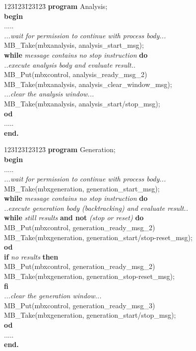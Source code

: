 \begin{tabbing}
123\= 123\= 123\= 123\= \kill
{\bf program} Analysis; \\
{\bf begin} \\
\> ..... \\
\> {\em ...wait for permission to continue with process body...} \\
\> MB\_Take(mbxanalysis, analysis\_start\_msg); \\
\> {\bf while} {\em message contains no stop instruction} {\bf do} \\
\> \> {\em ..execute analysis body and evaluate result..} \\
\> \> MB\_Put(mbxcontrol, analysis\_ready\_msg\_2) \\
\> \> MB\_Take(mbxanalysis, analysis\_clear\_window\_msg); \\
\> \> {\em ...clear the analysis window...} \\
\> \> MB\_Take(mbxanalysis, analysis\_start/stop\_msg); \\
\> {\bf od} \\
\> ..... \\
{\bf end.} \\
\end{tabbing}
\begin{tabbing}
123\= 123\= 123\= 123\= \kill
{\bf program} Generation; \\
{\bf begin} \\
\> ..... \\
\> {\em ...wait for permission to continue with process body...} \\
\> MB\_Take(mbxgeneration, generation\_start\_msg); \\
\> {\bf while} {\em message contains no stop instruction} {\bf do} \\
\> \> {\em ..execute generation body (backtracking) and evaluate result..} \\
\> \> {\bf while} {\em still results} {\bf and not} {\em (stop or reset)} {\bf do} \\
\> \> \> MB\_Put(mbxcontrol, generation\_ready\_msg\_2) \\
\> \> \> MB\_Take(mbxgeneration, generation\_start/stop-reset\_msg); \\
\> \> {\bf od} \\
\> \> {\bf if} {\em no results} {\bf then} \\
\> \> \> MB\_Put(mbxcontrol, generation\_ready\_msg\_2) \\
\> \> \> MB\_Take(mbxgeneration, generation\_stop-reset\_msg); \\
\> \> {\bf fi} \\
\> \> {\em ...clear the generation window...} \\
\> \> MB\_Put(mbxcontrol, generation\_ready\_msg\_3) \\
\> \> MB\_Take(mbxgeneration, generation\_start/stop\_msg); \\
\> {\bf od} \\
\> ..... \\
{\bf end.} \\
\end{tabbing}
